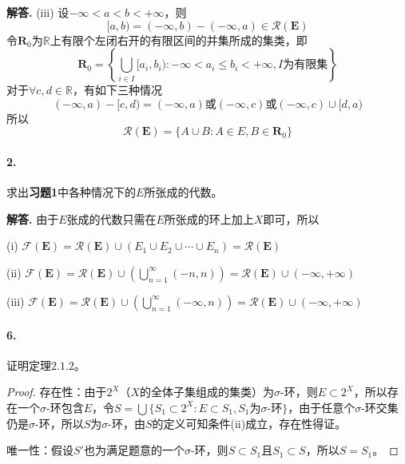 \documentclass[12pt, a4paper, oneside]{ctexart}
\newenvironment{solution}{\par\noindent\textbf{解答. }}{\bigskip\par}
\begin{document}
\begin{solution}
    (iii) 设$-\infty < a < b < +\infty$，则
    \begin{equation*}
        [a,b) = (-\infty, b)-(-\infty, a) \in \mathcal{R}(\mathbf{E})
    \end{equation*}
    令$\mathbf{R}_0$为$\mathbb{R}$上有限个左闭右开的有限区间的并集所成的集类，即
    \begin{equation*}
        \mathbf{R}_0=\left\{\bigcup_{i\in I}[a_i,b_i):-\infty< a_i\leqslant b_i < +\infty, I\text{为有限集}\right\}
    \end{equation*}
    对于$\forall c, d\in \mathbb{R}$，有如下三种情况
    \begin{equation*}
        (-\infty,a) - [c, d) = (-\infty, a) \text{或} (-\infty, c)\text{或}(-\infty, c)\cup [d, a)
    \end{equation*}
    所以
    \begin{equation*}
        \mathcal{R}(\mathbf{E}) = \{A\cup B:A\in E, B\in \mathbf{R}_0\}
    \end{equation*}
\end{solution}
\paragraph{2.}求出\textbf{习题1}中各种情况下的$E$所张成的代数。
\begin{solution}
    由于$E$张成的代数只需在$E$所张成的环上加上$X$即可，所以

    (i) $\mathcal{F}(\mathbf{E}) = \mathcal{R}(\mathbf{E})\cup (E_1\cup E_2 \cup\cdots\cup E_n) =  \mathcal{R}(\mathbf{E})$

    (ii) $\displaystyle\mathcal{F}(\mathbf{E}) = \mathcal{R}(\mathbf{E})\cup\left(\bigcup_{n=1}^\infty (-n,n)\right) = \mathcal{R}(\mathbf{E})\cup(-\infty,+\infty)$

    (iii) $\displaystyle\mathcal{F}(\mathbf{E}) = \mathcal{R}(\mathbf{E})\cup\left(\bigcup_{n=1}^\infty (-\infty,n)\right) = \mathcal{R}(\mathbf{E})\cup(-\infty,+\infty)$
\end{solution}
\paragraph{6.}证明定理$2.1.2$。
\begin{proof}
    存在性：由于$2^X$（$X$的全体子集组成的集类）为$\sigma$-环，则$E\subset 2^X$，所以存在一个$\sigma$-环包含$E$，令$S = \bigcup\{S_1\subset 2^X:E\subset S_1,S_1\text{为}\sigma\text{-环}\}$，由于任意个$\sigma$-环交集仍是$\sigma$-环，所以$S$为$\sigma$-环，由$S$的定义可知条件(ii)成立，存在性得证。

    唯一性：假设$S'$也为满足题意的一个$\sigma$-环，则$S\subset S_1$且$S_1\subset S$，所以$S=S_1$。
\end{proof}
\end{document}
